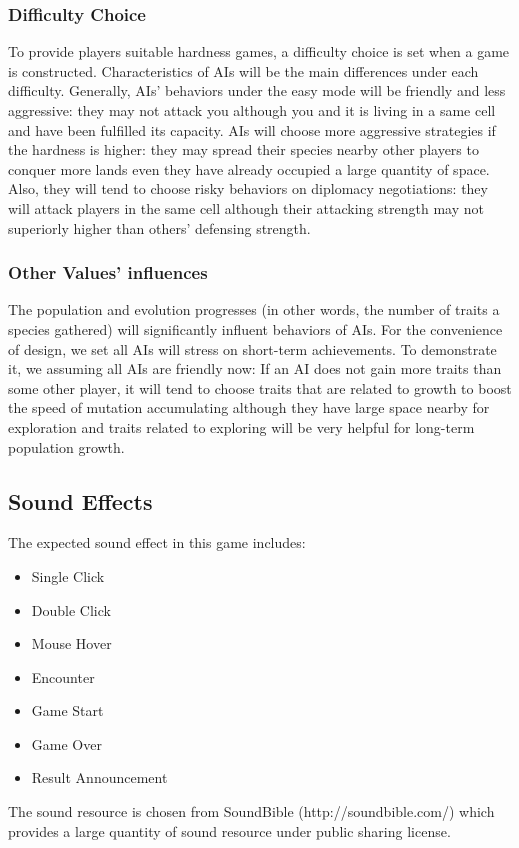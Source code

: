 \documentclass[12pt,a4paper]{article}
\begin{document}
\subsubsection{Difficulty Choice}
To provide players suitable hardness games, a difficulty choice is set when a game is constructed. Characteristics of AIs will be the main differences under each difficulty. Generally, AIs' behaviors under the easy mode will be friendly and less aggressive: they may not attack you although you and it is living in a same cell and have been fulfilled its capacity. AIs will choose more aggressive strategies if the hardness is higher: they may spread their species nearby other players to conquer more lands even they have already occupied a large quantity of space. Also, they will tend to choose risky behaviors on diplomacy negotiations: they will attack players in the same cell although their attacking strength may not superiorly higher than others' defensing strength.

\subsubsection{Other Values' influences}
The population and evolution progresses (in other words, the number of traits a species gathered) will significantly influent behaviors of AIs. For the convenience of design, we set all AIs will stress on short-term achievements. To demonstrate it, we assuming all AIs are friendly now: If an AI does not gain more traits than some other player, it will tend to choose traits that are related to growth to boost the speed of mutation accumulating although they have large space nearby for exploration and traits related to exploring will be very helpful for long-term population growth. 

	\subsection{Sound Effects}
	The expected sound effect in this game includes:
	\begin{itemize}
		\item Single Click
		\item Double Click
		\item Mouse Hover
		\item Encounter
		\item Game Start
		\item Game Over
		\item Result Announcement 
	\end{itemize}
	The sound resource is chosen from SoundBible (http://soundbible.com/) which provides a large quantity of sound resource under public sharing license.
	
\end{document}
